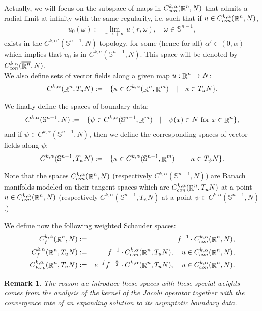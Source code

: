 \documentclass[a4paper,11pt,reqno]{amsart}
\newtheorem{rk}[defn]{Remark}
\def\R{\mathop{\rm \mathbb{R}}\nolimits}
\newcommand{\Sp}{\mathbb{S}}
\begin{document}
\begin{enumerate}
 Actually, we will focus on the subspace of maps in $C_{con}^{k,\alpha}(\R^n,N)$ that admits a radial limit at infinity with the same regularity, i.e. such that if $u\in C_{con}^{k,\alpha}(\R^n,N)$, 
\begin{eqnarray*}
 u_0(\omega):=\lim_{r\rightarrow+\infty} u(r,\omega), \quad\omega\in\mathbb{S}^{n-1},
 \end{eqnarray*}
exists in the $C^{k,\alpha'}(\mathbb{S}^{n-1},N)$ topology, for some (hence for all) $\alpha'\in(0,\alpha)$ which implies that $u_0$ is in $C^{k,\alpha}(\mathbb{S}^{n-1},N)$. This space will be denoted by $C_{con}^{k,\alpha}(\overline{\R^n},N)$.\\


We also define sets of vector fields along a given map $u:\R^n\rightarrow N$:
\begin{eqnarray*}
C^{k,\alpha}(\R^n,T_uN)&:=&\{\kappa\in C^{k,\alpha}(\R^n,\R^m)\quad|\quad \kappa\in T_uN\}.\\
\end{eqnarray*}

We finally define the spaces of boundary data:
\begin{eqnarray*}
C^{k,\alpha}(\Sp^{n-1},N)&:=&\{\psi\in C^{k,\alpha}(\Sp^{n-1},\R^m)\quad|\quad \text{$\psi(x)\in N$ for $x\in \R^n$}\},
\end{eqnarray*}
and if $\psi\in C^{k,\alpha}(\Sp^{n-1},N)$, then we define the corresponding spaces of vector fields along $\psi$:
\begin{eqnarray*}
C^{k,\alpha}(\Sp^{n-1},T_{\psi}N)&:=&\{\kappa\in C^{k,\alpha}(\Sp^{n-1},\R^m)\quad|\quad \text{$\kappa\in T_{\psi}N$} \}.
\end{eqnarray*}


\end{enumerate}

Note that the spaces $C_{con}^{k,\alpha}(\R^n,N)$ (respectively $C^{k,\alpha}(\Sp^{n-1},N)$) are Banach manifolds modeled on their tangent spaces which are $C_{con}^{k,\alpha}(\R^n,T_uN)$ at a point $u\in C_{con}^{k,\alpha}(\R^n,N)$ (respectively $C^{k,\alpha}(\Sp^{n-1},T_{\psi}N)$ at a point $\psi\in C^{k,\alpha}(\Sp^{n-1},N)$.)

We define now the following weighted Schauder spaces:
\begin{eqnarray*}
C_f^{k,\alpha}(\R^n,N)&:=&f^{-1}\cdot C_{con}^{k,\alpha}(\R^n,N),\\
C_f^{k,\alpha}(\R^n,T_uN)&:=&f^{-1}\cdot C_{con}^{k,\alpha}(\R^n,T_uN),\quad u\in C_{con}^{k,\alpha}(\R^n,N),\\
C_{Exp}^{k,\alpha}(\R^n,T_uN)&:=&e^{-f}f^{-\frac{n}{2}}\cdot C^{k,\alpha}(\R^n,T_uN),\quad u\in C_{con}^{k,\alpha}(\R^n,N).
\end{eqnarray*}
\begin{rk}
The reason we introduce these spaces with these special weights comes from the analysis of the kernel of the Jacobi operator together with the convergence rate of an expanding solution to its asymptotic boundary data. 
\end{rk}
\end{document}
